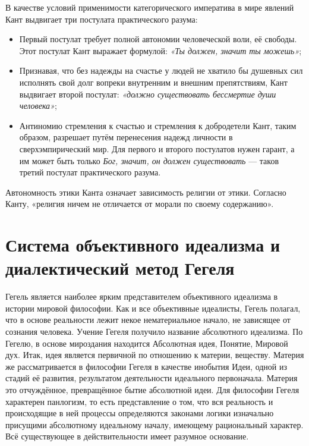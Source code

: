 \documentclass[12pt]{article}
\begin{document}
В качестве условий применимости категорического императива в мире явлений Кант выдвигает три постулата
практического разума:
\begin{itemize}
\item Первый постулат требует полной автономии человеческой воли, её свободы.
	Этот постулат Кант выражает формулой: \textit{«Ты должен, значит ты можешь»};
\item Признавая, что без надежды на счастье у людей не хватило бы душевных сил исполнять свой долг
	вопреки внутренним и внешним препятствиям, Кант выдвигает второй постулат:
	\textit{«должно существовать бессмертие души человека»};
\item Антиномию стремления к счастью и стремления к добродетели Кант,
	таким образом, разрешает путём перенесения надежд личности в сверхэмпирический мир.
	Для первого и второго постулатов нужен гарант, а им может быть только \textit{Бог, значит,
	он должен существовать} — таков третий постулат практического разума.
\end{itemize}
Автономность этики Канта означает зависимость религии от этики.
Согласно Канту, «религия ничем не отличается от морали по своему содержанию».


\newpage
\section{Система объективного идеализма и диалектический метод Гегеля}
Гегель является наиболее ярким представителем объективного идеализма в истории мировой философии. Как и все объективные идеалисты, Гегель полагал, что в основе реальности лежит некое нематериальное начало, не зависящее от сознания человека. Учение Гегеля получило название абсолютного идеализма. По Гегелю, в основе мироздания находится Абсолютная идея, Понятие, Мировой дух.
Итак, идея является первичной по отношению к материи, веществу. Материя же рассматривается в философии Гегеля в качестве инобытия Идеи, одной из стадий её развития, результатом деятельности идеального первоначала. Материя это отчуждённое, превращённое бытие абсолютной идеи. Для философии Гегеля характерен панлогизм, то есть представление о том, что вся реальность и происходящие в ней процессы определяются законами логики изначально присущими абсолютному идеальному началу, имеющему рациональный характер. Всё существующее в действительности имеет разумное основание.
\end{document}
